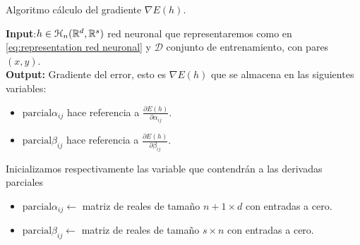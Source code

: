 \begin{algorithm}[H] \label{algoritmo:calculo-gradiente}
    \caption{Algoritmo cálculo del gradiente $\nabla E(h)$.}
    \hspace*{\algorithmicindent} \textbf{Input}:$h \in  \mathcal{H}_n(\mathbb{R}^d,\mathbb{R}^s)$ red neuronal que representaremos como en \ref{eq:representation red neuronal} y $\mathcal{D}$ conjunto de entrenamiento, con pares $(x, y)$. \\
    \hspace*{\algorithmicindent} \textbf{Output:} Gradiente del error, esto es $\nabla E(h)$ que se almacena en las siguientes variables: 
    \begin{itemize}
        \item $\text{parcial} \alpha_{i j}$ hace referencia a $\frac{\partial E(h)}{\partial \alpha_{i j}}$. 
   
        \item $\text{parcial} \beta _{i j}$ hace referencia a $\frac{\partial E(h)}{\partial \beta _{i j}}$. 
    \end{itemize} 
    \begin{algorithmic}[1]
        \STATE Inicializamos respectivamente las variable que contendrán a las derivadas parciales
        \begin{itemize}
            \item $\text{parcial} \alpha_{i j} \gets$ matriz de reales de tamaño $n+1 \times d$ con entradas a cero. 
            \item $\text{parcial} \beta_{i j} \gets$ matriz de reales de tamaño $s \times n$ con entradas a cero. 
        \end{itemize}
        \STATE 
\end{algorithmic}
\end{algorithm}
